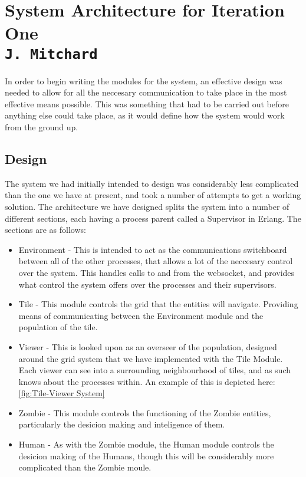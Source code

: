 \pagestyle{empty}

\section{System Architecture for Iteration One\\{\small\tt{J.~Mitchard}}}
In order to begin writing the modules for the system, an effective design was needed to allow for all the neccesary communication to take place in the most effective means possible. This was something that had to be carried out before anything else could take place, as it would define how the system would work from the ground up.

\subsection{Design}
The system we had initially intended to design was considerably less complicated than the one we have at present, and took a number of attempts to get a working solution. The architecture we have designed splits the system into a number of different sections, each having a process parent called a Supervisor in Erlang. The sections are as follows:
\begin{itemize}
\item Environment - This is intended to act as the communications switchboard between all of the other processes, that allows a lot of the neccesary control over the system. This handles calls to and from the websocket, and provides what control the system offers over the processes and their supervisors.
\item Tile - This module controls the grid that the entities will navigate. Providing means of communicating between the Environment module and the population of the tile.
\item Viewer - This is looked upon as an overseer of the population, designed around the grid system that we have implemented with the Tile Module. Each viewer can see into a surrounding neighbourhood of tiles, and as such knows about the processes within. An example of this is depicted here: \ref{fig:Tile-Viewer System}
\item Zombie - This module controls the functioning of the Zombie entities, particularly the desicion making and inteligence of them.
\item Human - As with the Zombie module, the Human module controls the desicion making of the Humans, though this will be considerably more complicated than the Zombie moule.
\end{itemize}
\clearpage
\endinput
